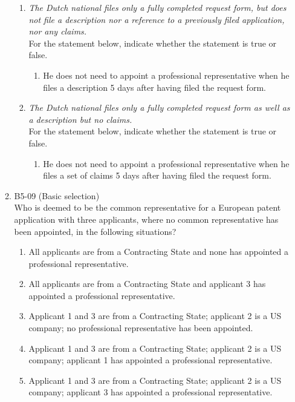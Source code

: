 \documentclass{report}
\begin{document}
\begin{enumerate}[label=\textbf{Question \arabic*}]
\begin{enumerate}[label=\textbf{Question \arabic*}]
\begin{enumerate}[label=(\alph*)]
        \item \textit{The Dutch national files only a fully completed request form, but does not file a description nor a reference to a previously filed application, nor any claims.} \\
        For the statement below, indicate whether the statement is true or false.
        \begin{enumerate}[label={(\alph{enumi}.\arabic*)}]
            \item He does not need to appoint a professional representative when he files a description 5 days after having filed the request form.
        \end{enumerate}
        
        \item \textit{The Dutch national files only a fully completed request form as well as a description but no claims.} \\
        For the statement below, indicate whether the statement is true or false.
        \begin{enumerate}[label={(\alph{enumi}.\arabic*)}]
            \item He does not need to appoint a professional representative when he files a set of claims 5 days after having filed the request form.
        \end{enumerate}
    \end{enumerate}

    \item %
    B5-09 (Basic selection) \\
    Who is deemed to be the common representative for a European patent application with three applicants, where no common representative has been appointed, in the following situations?
    
    \begin{enumerate}[label=(\alph*)]
        \item All applicants are from a Contracting State and none has appointed a professional representative.
        \item All applicants are from a Contracting State and applicant 3 has appointed a professional representative.
        \item Applicant 1 and 3 are from a Contracting State; applicant 2 is a US company; no professional representative has been appointed.
        \item Applicant 1 and 3 are from a Contracting State; applicant 2 is a US company; applicant 1 has appointed a professional representative.
        \item Applicant 1 and 3 are from a Contracting State; applicant 2 is a US company; applicant 3 has appointed a professional representative.
    \end{enumerate}

\end{enumerate}
\end{enumerate}
\end{document}
